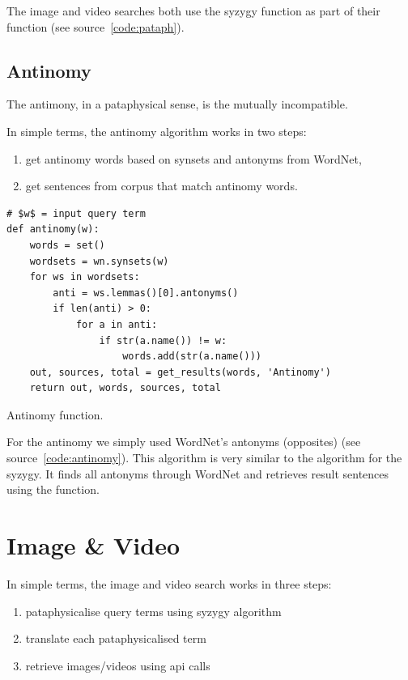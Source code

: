 
The image and video searches both use the syzygy function as part of their  function (see source~\ref{code:pataph}).


\subsection{Antinomy}

The antimony, in a pataphysical sense, is the mutually incompatible.

In simple terms, the antinomy algorithm works in two steps:
\begin{enumerate}
  \item get antinomy words based on synsets and antonyms from WordNet,
  \item get sentences from corpus that match antinomy words.
\end{enumerate}

\begin{listing}
  \begin{verbatim}
# $w$ = input query term
def antinomy(w):
    words = set()
    wordsets = wn.synsets(w)
    for ws in wordsets:
        anti = ws.lemmas()[0].antonyms()
        if len(anti) > 0:
            for a in anti:
                if str(a.name()) != w:
                    words.add(str(a.name()))
    out, sources, total = get_results(words, 'Antinomy')
    return out, words, sources, total
  \end{verbatim}
\caption{Antinomy function.}
\label{code:antinomy}
\end{listing}

For the antinomy we simply used WordNet's antonyms (opposites) (see source~\ref{code:antinomy}). This algorithm is very similar to the algorithm for the syzygy. It finds all antonyms through WordNet and retrieves result sentences using the  function.


\section{Image \& Video}

In simple terms, the image and video search works in three steps:
\begin{enumerate}
  \item pataphysicalise query terms using syzygy algorithm
  \item translate each pataphysicalised term
  \item retrieve images/videos using \acrshort{api} calls
\end{enumerate}


